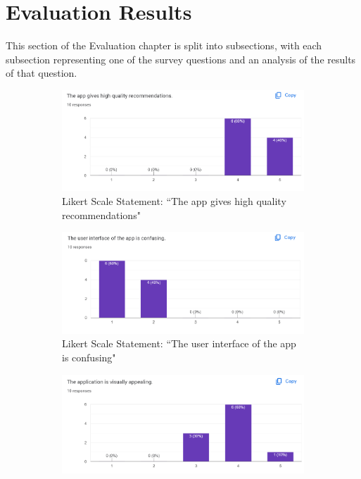 \documentclass{l4proj}
\begin{document}
\section{Evaluation Results}
This section of the Evaluation chapter is split into subsections, with each subsection representing one of the survey questions and an analysis of the results of that question. 
\begin{figure}
    \centering
    \begin{subfigure} [b] {0.49\textwidth}
        \centering
        \includegraphics[width=1\textwidth]{images/Q1.png}
        \caption{Likert Scale Statement: ``The app gives high quality recommendations"}
        \label{fig:Q1}
    \end{subfigure}
    \hfill
    \begin{subfigure} [b] {0.49\textwidth}
        \centering
        \includegraphics[width=1\textwidth]{images/Q2.png}
        \caption{Likert Scale Statement: ``The user interface of the app is confusing"}
        \label{fig:Q2}
    \end{subfigure}
    \hfill
    \begin{subfigure} [b] {0.49\textwidth}
        \centering
        \includegraphics[width=1\textwidth]{images/Q3.png}

\end{subfigure}
\end{figure}
\end{document}

